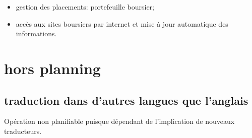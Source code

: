 \begin{itemize}
	\item gestion des placements: portefeuille boursier;
	\item accès aux sites boursiers par internet et mise à jour automatique des 	informations.
\end{itemize}


\section{hors planning}

\subsection{traduction dans d'autres langues que l'anglais}

Opération non planifiable puisque dépendant de l'implication de nouveaux traducteurs.

